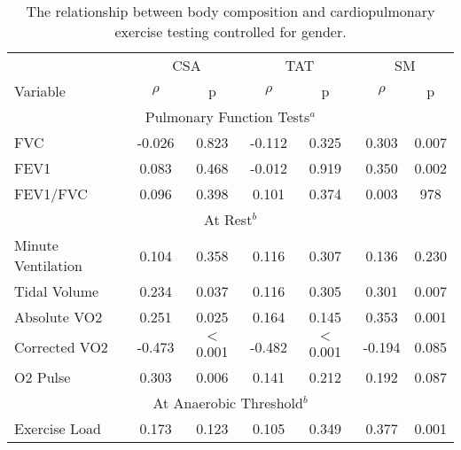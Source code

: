 \begin{table}[p]
	\caption{The relationship between body composition and cardiopulmonary exercise testing controlled for gender.}
	\label{table:bc_cpet}
	\centering
	\renewcommand{\arraystretch}{1.4} %
	\setlength{\tabcolsep}{9pt} %
	\begin{tabular}{l | c c | c c | c c}
		                   & \multicolumn{2}{c}{CSA} & \multicolumn{2}{c}{TAT} &      \multicolumn{2}{c}{SM}       \\
		Variable           & $\rho$ & p              & $\rho$ & p              & $\rho$ & p                        \\ \hline
		                             \multicolumn{7}{c}{Pulmonary Function Tests$^a$}                              \\ \hline
		FVC                & -0.026 & 0.823          & -0.112 & 0.325          & 0.303  & 0.007                    \\
		FEV1               & 0.083  & 0.468          & -0.012 & 0.919          & 0.350  & 0.002                    \\
		FEV1/FVC           & 0.096  & 0.398          & 0.101  & 0.374          & 0.003  & 978                      \\ \hline
		                                     \multicolumn{7}{c}{At Rest$^b$}                                       \\ \hline
		Minute Ventilation & 0.104  & 0.358          & 0.116  & 0.307          & 0.136  & 0.230                    \\
		Tidal Volume       & 0.234  & 0.037          & 0.116  & 0.305          & 0.301  & 0.007                    \\
		Absolute VO2       & 0.251  & 0.025          & 0.164  & 0.145          & 0.353  & 0.001                    \\
		Corrected VO2      & -0.473 & $<$0.001       & -0.482 & $<$0.001       & -0.194 & 0.085                    \\
		O2 Pulse           & 0.303  & 0.006          & 0.141  & 0.212          & 0.192  & 0.087                    \\ \hline
		                              \multicolumn{7}{c}{At Anaerobic Threshold$^b$}                               \\ \hline
		Exercise Load      & 0.173  & 0.123          & 0.105  & 0.349          & 0.377  & 0.001                    \\

\end{tabular}
\end{table}
